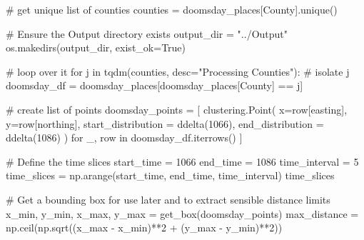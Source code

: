\documentclass[
  11pt,
  letterpaper,
  DIV=11,
  numbers=noendperiod]{scrartcl}
\newenvironment{Shaded}{\begin{snugshade}}{\end{snugshade}}
\newcommand{\CommentTok}[1]{\textcolor[rgb]{0.37,0.37,0.37}{#1}}
\newcommand{\ControlFlowTok}[1]{\textcolor[rgb]{0.00,0.23,0.31}{#1}}
\newcommand{\DecValTok}[1]{\textcolor[rgb]{0.68,0.00,0.00}{#1}}
\newcommand{\KeywordTok}[1]{\textcolor[rgb]{0.00,0.23,0.31}{#1}}
\newcommand{\NormalTok}[1]{\textcolor[rgb]{0.00,0.23,0.31}{#1}}
\newcommand{\OperatorTok}[1]{\textcolor[rgb]{0.37,0.37,0.37}{#1}}
\newcommand{\StringTok}[1]{\textcolor[rgb]{0.13,0.47,0.30}{#1}}
\newcommand{\VariableTok}[1]{\textcolor[rgb]{0.07,0.07,0.07}{#1}}
\begin{document}
\begin{Shaded}
\begin{Highlighting}[]
\CommentTok{\# get unique list of counties}
\NormalTok{counties }\OperatorTok{=}\NormalTok{ doomsday\_places[}\StringTok{\textquotesingle{}County\textquotesingle{}}\NormalTok{].unique()}

\CommentTok{\# Ensure the Output directory exists}
\NormalTok{output\_dir }\OperatorTok{=} \StringTok{"../Output"}
\NormalTok{os.makedirs(output\_dir, exist\_ok}\OperatorTok{=}\VariableTok{True}\NormalTok{)}

\CommentTok{\# loop over it}
\ControlFlowTok{for}\NormalTok{ j }\KeywordTok{in}\NormalTok{ tqdm(counties, desc}\OperatorTok{=}\StringTok{"Processing Counties"}\NormalTok{):}
    \CommentTok{\# isolate j}
\NormalTok{    doomsday\_df }\OperatorTok{=}\NormalTok{ doomsday\_places[doomsday\_places[}\StringTok{\textquotesingle{}County\textquotesingle{}}\NormalTok{] }\OperatorTok{==}\NormalTok{ j]}

    \CommentTok{\# create list of points}
\NormalTok{    doomsday\_points }\OperatorTok{=}\NormalTok{ [}
\NormalTok{    clustering.Point(}
\NormalTok{        x}\OperatorTok{=}\NormalTok{row[}\StringTok{\textquotesingle{}easting\textquotesingle{}}\NormalTok{],}
\NormalTok{        y}\OperatorTok{=}\NormalTok{row[}\StringTok{\textquotesingle{}northing\textquotesingle{}}\NormalTok{],}
\NormalTok{        start\_distribution }\OperatorTok{=}\NormalTok{ ddelta(}\DecValTok{1066}\NormalTok{),}
\NormalTok{        end\_distribution }\OperatorTok{=}\NormalTok{ ddelta(}\DecValTok{1086}\NormalTok{)}
\NormalTok{    )}
    \ControlFlowTok{for}\NormalTok{ \_, row }\KeywordTok{in}\NormalTok{ doomsday\_df.iterrows()}
\NormalTok{    ]}

    \CommentTok{\# Define the time slices}
\NormalTok{    start\_time }\OperatorTok{=} \DecValTok{1066}
\NormalTok{    end\_time }\OperatorTok{=} \DecValTok{1086}
\NormalTok{    time\_interval }\OperatorTok{=} \DecValTok{5}
\NormalTok{    time\_slices }\OperatorTok{=}\NormalTok{ np.arange(start\_time, end\_time, time\_interval)}
\NormalTok{    time\_slices}

    \CommentTok{\# Get a bounding box for use later and to extract sensible distance limits}
\NormalTok{    x\_min, y\_min, x\_max, y\_max }\OperatorTok{=}\NormalTok{ get\_box(doomsday\_points)}
\NormalTok{    max\_distance }\OperatorTok{=}\NormalTok{ np.ceil(np.sqrt((x\_max }\OperatorTok{{-}}\NormalTok{ x\_min)}\OperatorTok{**}\DecValTok{2} \OperatorTok{+}\NormalTok{ (y\_max }\OperatorTok{{-}}\NormalTok{ y\_min)}\OperatorTok{**}\DecValTok{2}\NormalTok{))}


\end{Highlighting}
\end{Shaded}
\end{document}
